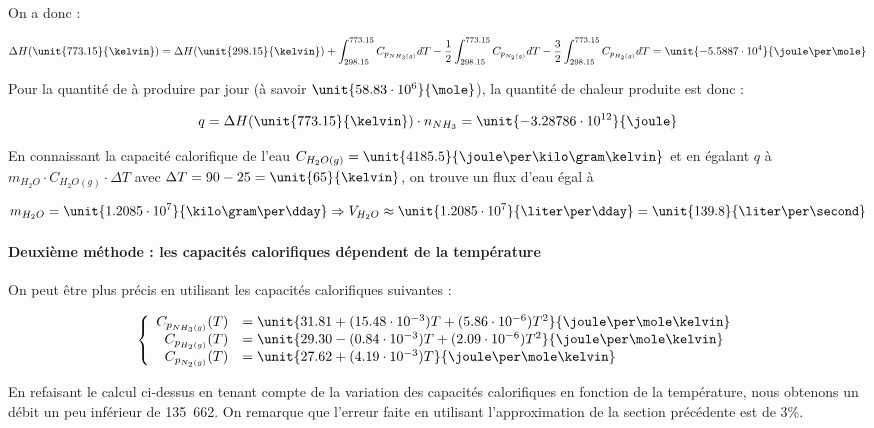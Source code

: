 On a donc :

$$\Delta H(\unit{773.15}{\kelvin}) = \Delta H(\unit{298.15}{\kelvin})
+ \int_{298.15}^{773.15} C_{p_{NH_3(g)}} dT - \frac{1}{2}\int_{298.15}^{773.15} C_{p_{N_2(g)}} dT
- \frac{3}{2} \int_{298.15}^{773.15} C_{p_{H_2(g)}} dT = \unit{-5.5887 \cdot 10^4}{\joule\per\mole}$$

Pour la quantité de  à produire par jour 
(à savoir $\unit{58.83 \cdot 10^6}{\mole}$),
la quantité de chaleur produite est donc :

$$q = \Delta H(\unit{773.15}{\kelvin}) \cdot n_{NH_3} = \unit{-3.28786 \cdot 10^{12}}{\joule}$$

En connaissant la capacité calorifique de l'eau $C_{H_2O(g)} =
\unit{4185.5}{\joule\per\kilo\gram\kelvin}$ \cite{atkins}et en égalant
$q$ à $m_{H_2O} \cdot C_{H_2O(g)} \cdot \Delta T$ avec 
$\Delta T = 90 - 25 = \unit{65}{\kelvin}$, on trouve un
flux d'eau égal à

$$m_{H_2O} = \unit{1.2085 \cdot 10^7}{\kilo\gram\per\dday} \Rightarrow V_{H_2O} \approx \unit{1.2085 \cdot 10^7}{\liter\per\dday} 
= \unit{139.8}{\liter\per\second}$$

\paragraph{Deuxième méthode : les capacités calorifiques dépendent de la température}
On peut être plus précis en utilisant les capacités calorifiques suivantes \cite{hc-table} :

	$$
	\left\{
		\begin{array}{rl}
			C_{p_{NH_3(g)}}(T) &= \unit{31.81 + (15.48 \cdot 10^{-3})T + (5.86 \cdot 10^{-6})T^2}{\joule\per\mole\kelvin}\\
			C_{p_{H_2(g)}}(T) 	&= \unit{29.30 - (0.84 \cdot 10^{-3})T + (2.09 \cdot 10^{-6})T^2}{\joule\per\mole\kelvin}\\
			C_{p_{N_2(g)}}(T) 	&= \unit{27.62 + (4.19 \cdot 10^{-3})T}{\joule\per\mole\kelvin}
		\end{array}
	\right.
	$$

En refaisant le calcul ci-dessus en tenant compte de la variation des capacités
calorifiques en fonction
de la température, nous obtenons un débit un peu inférieur 
de \unit{135.662}{\liter\per\second}. On remarque
que l'erreur faite en utilisant l'approximation de la section
précédente est de 3\%.

